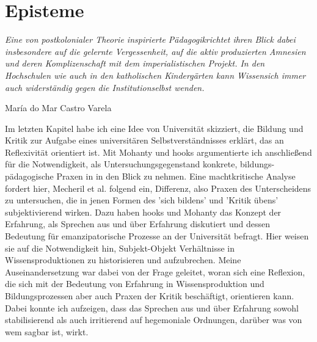 \section{Episteme} \epigraph{\textit{ Eine von postkolonialer Theorie
inspirierte \glqq Pädagogik\grqq richtet ihren Blick dabei insbesondere auf die
gelernte Vergessenheit, auf die aktiv produzierten Amnesien und deren
Komplizenschaft mit dem imperialistischen Projekt. In den Hochschulen wie auch
in den katholischen Kindergärten kann \glqq Wissen\grqq sich immer auch
widerständig gegen die \glqq Institution\grqq selbst wenden. }}{María do Mar
Castro Varela\footnotemark}  

Im letzten Kapitel habe ich eine Idee von Universität skizziert,
die Bildung und Kritik zur Aufgabe eines universitären Selbstverständnisses
erklärt, das an Reflexivität orientiert ist. Mit Mohanty und hooks argumentierte
ich anschließend für die Notwendigkeit, als Untersuchungsgegenstand konkrete,
bildungs-pädagogische Praxen in in den Blick zu nehmen. Eine machtkritische
Analyse fordert hier, Mecheril et al. folgend ein, Differenz, also Praxen des
Unterscheidens zu untersuchen, die in jenen Formen des 'sich bildens' und
'Kritik übens' subjektivierend wirken. Dazu haben hooks und Mohanty das Konzept
der Erfahrung, als Sprechen aus und über Erfahrung diskutiert und dessen
Bedeutung für emanzipatorische Prozesse an der Universität befragt. Hier weisen
sie auf die Notwendigkeit hin, Subjekt-Objekt Verhältnisse in
Wissensproduktionen zu historisieren und aufzubrechen.
Meine Auseinandersetzung
war dabei von der Frage geleitet, woran sich eine Reflexion, die sich mit der
Bedeutung von Erfahrung in Wissensproduktion und Bildungsprozessen aber auch
Praxen der Kritik beschäftigt, orientieren kann. Dabei konnte ich aufzeigen,
dass das Sprechen aus und über Erfahrung sowohl stabilisierend als auch
irritierend auf hegemoniale Ordnungen, darüber was von wem sagbar ist, wirkt.

